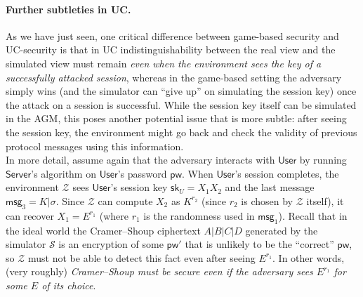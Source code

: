 \documentclass[12pt,a4paper]{article}
\newcommand{\simulator}{\mathcal{S}}
\newcommand{\env}{\mathcal{Z}}
\newcommand{\user}{\mathsf{User}}
\newcommand{\sk}{\mathsf{sk}}
\newcommand{\pw}{\mathsf{pw}}
\newcommand{\server}{\mathsf{Server}}
\newcommand{\msg}[1]{\mathsf{msg}_{#1}}
\begin{document}
\paragraph{Further subtleties in UC.}
As we have just seen, one critical difference between game-based security and UC-security is that in UC indistinguishability between the real view and the simulated view must remain \emph{even when the environment sees the key of a successfully attacked session}, whereas in the game-based setting the adversary simply wins (and the simulator can ``give up'' on simulating the session key) once the attack on a session is successful. While the session key itself can be simulated in the AGM, this poses another potential issue that is more subtle: after seeing the session key, the environment might go back and check the validity of previous protocol messages using this information.\\

In more detail, assume again that the adversary interacts with $\user$ by running $\server$'s algorithm on $\user$'s password $\pw$. When $\user$'s session completes, the environment $\env$ sees $\user$'s session key $\sk_U = X_1X_2$ and the last message $\msg{3} = K|\sigma$. Since $\env$ can compute $X_2$ as $K^{r_2}$ (since $r_2$ is chosen by $\env$ itself), it can recover $X_1 = E^{r_1}$ (where $r_1$ is the randomness used in $\msg{1}$). Recall that in the ideal world the Cramer--Shoup ciphertext $A|B|C|D$ generated by the simulator $\simulator$ is an encryption of some $\pw'$ that is unlikely to be the ``correct'' $\pw$, so $\env$ must not be able to detect this fact even after seeing $E^{r_1}$. In other words, (very roughly) \emph{Cramer--Shoup must be secure even if the adversary sees $E^{r_1}$ for some $E$ of its choice}.\\
\end{document}
